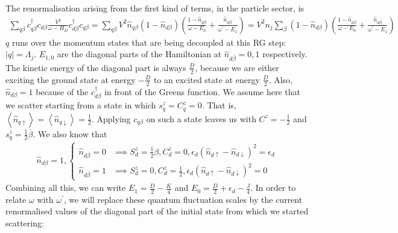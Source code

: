 The renormalisation arising from the first kind of terms, in the particle sector, is
\begin{equation}\begin{aligned}
	\sum_{q\beta}c^\dagger_{q\beta}c_{d\beta}\frac{V^2}{\omega - H_D}c^\dagger_{d\beta}c_{q\beta} = \sum_{q\beta}V^2 \hat n_{q\beta} \left( 1 - \hat n_{d\beta} \right)\left( \frac{1-\hat n_{d \overline\beta }}{\omega - E_0} + \frac{\hat n_{d \overline\beta}}{\omega^\prime - E_1}\right) = V^2 n_j\sum_{\beta}\left( 1 - \hat n_{d\beta} \right)\left( \frac{1-\hat n_{d \overline\beta }}{\omega - E_0} + \frac{\hat n_{d \overline\beta}}{\omega^\prime - E_1}\right)
\end{aligned}\end{equation}
\(q\) runs over the momentum states that are being decoupled at this RG step: \(|q| = \Lambda_j\). \(E_{1,0}\) are the diagonal parts of the Hamiltonian at \(\hat n_{d\overline \beta}=0,1\) respectively. The kinetic energy of the diagonal part is always \(\frac{D}{2}\), because we are either exciting the ground state at energy \(-\frac{D}{2}\) to an excited state at energy \(\frac{D}{2}\). Also, \(\hat n_{d\beta}=1\) because of the \(c^\dagger_{d\beta}\) in front of the Greens function. We assume here that we scatter starting from a state in which \(s_q^z = C_q^z = 0\). That is, \(\left<\hat n_{q \uparrow}\right> = \left<\hat n_{q \downarrow}\right> = \frac{1}{2}\). Applying \(c_{q\beta}\) on such a state leaves us with \(C^z = - \frac{1}{2}\) and \(s^z_q = \frac{1}{2}\overline\beta\). We also know that
\begin{equation}\begin{aligned}
	\hat n_{d\beta}=1,
	\begin{cases}
		\hat n_{d\overline\beta}=0 &\implies S_d^z = \frac{1}{2}\beta, C_d^z = 0, \epsilon_d\left(\hat n_{d\uparrow} - \hat n_{d \downarrow}\right)^2 = \epsilon_d\\	
		\hat n_{d\overline\beta}=1 &\implies S_d^z = 0, C_d^z = \frac{1}{2}, \epsilon_d\left(\hat n_{d\uparrow} - \hat n_{d \downarrow}\right)^2 = 0
	\end{cases}
\end{aligned}\end{equation}
Combining all this, we can write \(E_1 = \frac{D}{2} - \frac{K}{4}\) and \(E_0 = \frac{D}{2} + \epsilon_d - \frac{J}{4}\). In order to relate \(\omega\) with \(\omega^\prime\), we will replace these quantum fluctuation scales by the current renormalised values of the diagonal part of the initial state from which we started scattering:
